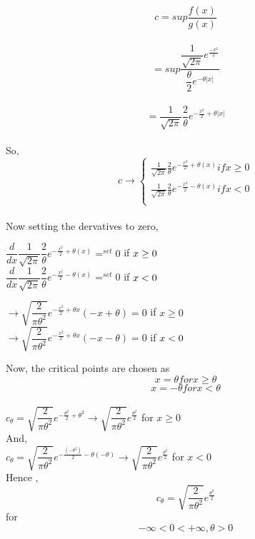 \documentclass[11pt]{article}
\begin{document}
\begin{enumerate}
\begin{enumerate}
                                   $$c= sup\dfrac{f(x)}{g(x)}$$\\
                                   $$= sup\dfrac{\dfrac{1}{\sqrt{2\pi}} e^\frac{-x^2}{2}}{{\dfrac{\theta}{2} }e^{-\theta|x|}}$$\\
                                   $$ = \dfrac{1}{\sqrt{2\pi}}\dfrac{2}{\theta} e^{-\frac{x^2}{2}+\theta|x|}$$\\
    So,
\begin{equation*}
c \rightarrow
\begin{cases}
\frac{1}{\sqrt{2\pi}}\frac{2}{\theta} e^{-\frac{x^2}{2}+\theta(x)} if x \geq 0\\
\frac{1}{\sqrt{2\pi}}\frac{2}{\theta} e^{-\frac{x^2}{2}-\theta(x)} if x < 0 \\
\end{cases}
\end{equation*}\\

Now setting the dervatives to zero,

$ \dfrac{d}{dx}  \dfrac{1}{\sqrt{2\pi}}\dfrac{2}{\theta} e^{-\frac{x^2}{2}+\theta(x)} =^{set} 0$  if $x \geq 0\\$\\
$\dfrac{d}{dx}    \dfrac{1}{\sqrt{2\pi}}\dfrac{2}{\theta} e^{-\frac{x^2}{2}-\theta(x)}  = ^{set} 0$ if $x < 0 \\$

$\rightarrow \sqrt{\dfrac{2}{\pi \theta^2}} e^{-\frac{x^2}{2}+\theta x}(-x+\theta) = 0 $ if $x \geq 0$\\
$ \rightarrow \sqrt{\dfrac{2}{\pi \theta^2}} e^{-\frac{x^2}{2}+\theta x}(-x - \theta) = 0 $ if $x < 0 \\$


Now, the critical points are chosen as 
$$ x = \theta for x \geq \theta$$
$$x = - \theta for  x < \theta $$\\

$c_{\theta} = \sqrt{\dfrac{2}{\pi \theta^2}} e ^{-\frac{\theta^2}{2}+\theta^2} \rightarrow \sqrt{\dfrac{2}{\pi \theta^2}}e^{\frac{\theta^2}{2}} $ for $ x \geq 0 $\\
And, \\
$c_{\theta} = \sqrt{\dfrac{2}{\pi \theta^2}} e ^{-\frac{(-\theta^2)}{2}- \theta(-\theta)} \rightarrow \sqrt{\dfrac{2}{\pi \theta^2}}e^{\frac{\theta^2}{2}} $ for $ x < 0 $\\

Hence ,\\

$$ c_{\theta} = \sqrt{\dfrac{2}{\pi \theta^2}} e^{\frac{\theta^2}{2}}$$
for $$-\infty < 0 < +\infty , \theta > 0 $$\\\\





\end{enumerate}
\end{enumerate}
\end{document}
